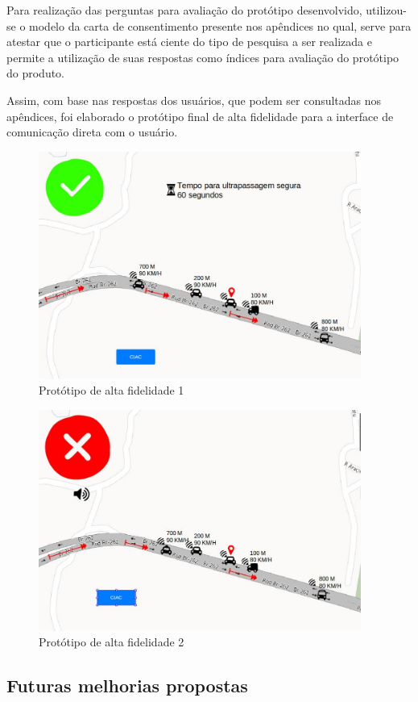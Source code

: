 Para realização das perguntas para avaliação do protótipo desenvolvido, utilizou-se o modelo da carta de consentimento presente nos apêndices no qual, serve para atestar que o participante está ciente do tipo de pesquisa a ser realizada e permite a utilização de suas respostas como índices para avaliação do protótipo do produto.

Assim, com base nas respostas dos usuários, que podem ser consultadas nos apêndices, foi elaborado o protótipo final de alta fidelidade para a interface de comunicação direta com o usuário.

\begin{figure}[h!]
  \centering
  \includegraphics[width=400px, scale=1]{figuras/alta1}
  \caption{Protótipo de alta fidelidade 1}
\label{fig:alta1}
\end{figure}	

\begin{figure}[h!]
  \centering
  \includegraphics[width=400px, scale=1]{figuras/alta2}
  \caption{Protótipo de alta fidelidade 2}
\label{fig:alta2}
\end{figure}	

\subsection{Futuras melhorias propostas}

